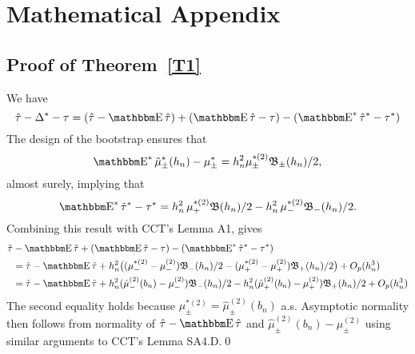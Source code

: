 \documentclass[12pt,fleqn]{article}
\begin{document}
\newpage\appendix
\section{Mathematical Appendix}
\subsection{Proof of Theorem~\ref{T1}}
We have
\begin{equation*}
  \hat\tau - \Delta^* - \tau = (\hat\tau - \E \hat \tau) +
  (\E \hat \tau - \tau) - (\E^* \hat \tau^* - \tau^*)
\end{equation*}
The design of the bootstrap ensures that
\begin{equation*}
  \label{eq:6}
  \E^* \hat\mu_{\pm}^*(h_n) - \mu_{\pm}^{*} =
  h_n^{2} \mu_\pm^{*(2)} \Bf_{\pm}(h_n)/2,
\end{equation*}
almost surely, implying that
\begin{equation*}
  \label{eq:7}
    \E^* \hat\tau^{*} - \tau^{*} = h_n^2\, \mu_+^{*(2)} \Bf(h_n)/2
      - h_n^2\, \mu_{-}^{*(2)} \Bf_{-}(h_n)/2.
\end{equation*}
Combining this result with CCT's Lemma A1, gives
\begin{align*}
  \hat\tau &- \E \hat\tau + (\E \hat\tau - \tau) - (\E^* \hat\tau^* - \tau^*)\\
  &= \hat\tau - \E\hat\tau
   + h_n^2 \big((\mu_{-}^{*(2)} - \mu_{-}^{(2)}) \Bf_{-}(h_{n}) /2
   - (\mu_+^{*(2)}-\mu_+^{(2)}) \Bf_{+}(h_{n}) / 2 \big) + O_p(h_n^{3}) \\
  &= \hat\tau - \E\hat\tau
   + h_n^2 (\hat\mu_-^{(2)}(b_n) - \mu_-^{(2)}) \Bf_{-}(h_{n}) /2
   - h_n^2 (\hat\mu_+^{(2)}(b_n) - \mu_+^{(2)}) \Bf_{+}(h_{n}) / 2 + O_p(h_n^{3})
\end{align*}
The second equality holds because
$\mu_\pm^{*(2)} = \hat\mu_{\pm}^{(2)}(b_n)$ a.s. Asymptotic normality then
follows from normality of $\hat\tau - \E\hat\tau$ and
$\hat\mu_\pm^{(2)}(b_n) - \mu_\pm^{(2)}$ using
similar arguments to CCT's Lemma SA4.D.\qed
\end{document}
